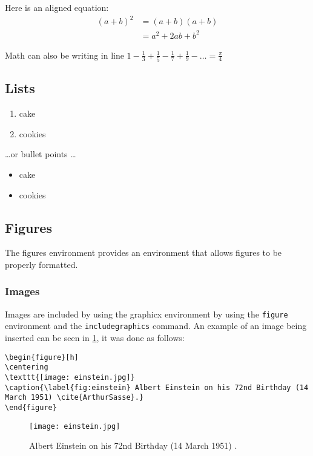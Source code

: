 \documentclass[11pt,a4paper,titlepage]{article}
\begin{document}
Here is an aligned equation:
\begin{align}
(a+b)^2  & = (a+b)(a+b)  \nonumber \\
  & = a^2+2ab+b^2 \label{eq:aplusbexpanded}
\end{align}


Math can also be writing in line $1-\frac{1}{3}+\frac{1}{5}-\frac{1}{7}+\frac{1}{9}-\ldots = \frac{\pi}{4}$

\subsection{Lists}

\begin{enumerate}
\item cake
\item cookies
\end{enumerate}

\dots or bullet points \dots

\begin{itemize}
\item cake
\item cookies
\end{itemize}


\subsection{Figures}
The figures environment provides an environment that allows figures to be properly formatted.
\subsubsection{Images}

Images are included by using the graphicx environment by using the \texttt{figure} environment and the \texttt{includegraphics} command. An example of an image being inserted can be seen in \ref{fig:einstein}, it was done as follows:

\begin{lstlisting}[breaklines]
\begin{figure}[h]
\centering
\texttt{[image: einstein.jpg]}
\caption{\label{fig:einstein} Albert Einstein on his 72nd Birthday (14 March 1951) \cite{ArthurSasse}.}
\end{figure}
\end{lstlisting}

\begin{figure}[h]
\centering
\texttt{[image: einstein.jpg]}
\caption{\label{fig:einstein} Albert Einstein on his 72nd Birthday (14 March 1951) \cite{ArthurSasse}.}
\end{figure}
\end{document}
